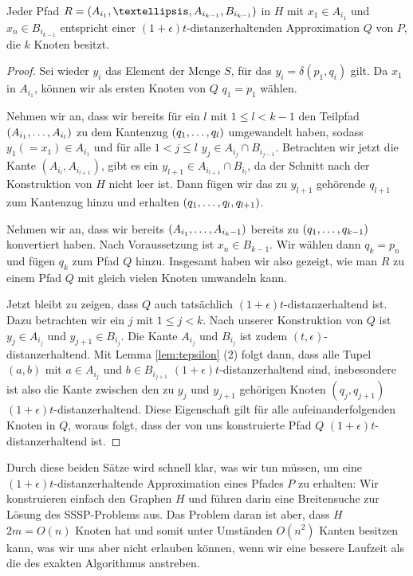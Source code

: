 	\begin{theorem}
		\label{theo:H2Approx}
		Jeder Pfad $R = (A_{i_1}, \textellipsis, A_{i_{k-1}}, B_{i_{k-1}})$ in $H$ mit $x_1 \in A_{i_1}$ und $x_n \in B_{i_{k-1}}$ entspricht einer $(1+\epsilon)t$-distanzerhaltenden Approximation $Q$ von $P$, die $k$ Knoten besitzt.
	\end{theorem}
	\begin{proof}
		Sei wieder $y_i$ das Element der Menge $S$, für das $y_i = \delta(p_1, q_i)$ gilt.
		Da $x_1$ in $A_{i_1}$, können wir als ersten Knoten von $Q$ $q_1 = p_1$ wählen.
		
		Nehmen wir an, dass wir bereits für ein $l$ mit $1 \leq l < k-1$ den Teilpfad $(A_{i_1}, \mathellipsis, A_{i_l})$ zu dem Kantenzug $(q_1, \mathellipsis, q_l)$ umgewandelt haben, sodass $y_1 (= x_1) \in A_{i_1}$ und für alle $1 < j \leq l$ $y_j \in A_{i_j} \cap B_{i_{j-1}}$. Betrachten wir jetzt die Kante $(A_{i_l}, A_{i_{l+1}})$, gibt es ein $y_{l+1} \in A_{i_{l+1}} \cap B_{i_l}$, da der Schnitt nach der Konstruktion von $H$ nicht leer ist. Dann fügen wir das zu $y_{l+1}$ gehörende $q_{l+1}$ zum Kantenzug hinzu und erhalten $(q_1, \mathellipsis, q_l, q_{l+1})$.
		
		Nehmen wir an, dass wir bereits $(A_{i_1}, \mathellipsis, A_{i_k-1})$ bereits zu $(q_1, \mathellipsis, q_{k-1})$ konvertiert haben. Nach Voraussetzung ist $x_n \in B_{k-1}$. Wir wählen dann $q_k = p_n$ und fügen $q_k$ zum Pfad $Q$ hinzu. 
		Insgesamt haben wir also gezeigt, wie man $R$ zu einem Pfad $Q$ mit gleich vielen Knoten umwandeln kann. 
		
		Jetzt bleibt zu zeigen, dass $Q$ auch tatsächlich $(1+\epsilon)t$-distanzerhaltend ist.
		Dazu betrachten wir ein $j$ mit $1 \leq j < k$. Nach unserer Konstruktion von $Q$ ist $y_j \in A_{i_j}$ und $y_{j+1} \in B_{i_j}$. Die Kante $A_{i_j}$ und $B_{i_j}$ ist zudem $(t, \epsilon)$-distanzerhaltend. Mit Lemma \ref{lem:tepsilon} (2) folgt dann, dass alle Tupel $(a, b)$ mit $a \in A_{i_j}$ und $b \in B_{i_{j+1}}$ $(1+\epsilon)t$-distanzerhaltend sind, insbesondere ist also die Kante zwischen den zu $y_j$ und $y_{j+1}$ gehörigen Knoten $(q_j, q_{j+1})$ $(1+\epsilon)t$-distanzerhaltend. Diese Eigenschaft gilt für alle aufeinanderfolgenden Knoten in $Q$, woraus folgt, dass der von uns konstruierte Pfad $Q$ $(1+\epsilon)t$-distanzerhaltend ist.
	\end{proof}
    
    Durch diese beiden Sätze wird schnell klar, was wir tun müssen, um eine $(1+\epsilon)t$-distanzerhaltende Approximation eines Pfades $P$ zu erhalten: Wir konstruieren einfach den Graphen $H$ und führen darin eine Breitensuche zur Lösung des SSSP-Problems aus. Das Problem daran ist aber, dass $H$ $2m = O(n)$ Knoten hat und somit unter Umständen $O(n^2)$ Kanten besitzen kann, was wir uns aber nicht erlauben können, wenn wir eine bessere Laufzeit als die des exakten Algorithmus anstreben.
    
